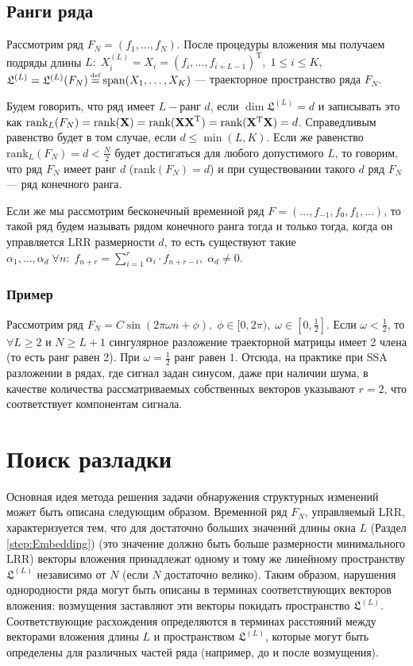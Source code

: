 \documentclass[specialist, substylefile = spbu.rtx,
			   subf, href, 12pt]{disser}
\newcommand\eqdef{\mathrel{\stackrel{\makebox[0pt]{\mbox{\normalfont\tiny def}}}{=}}}
\begin{document}
\section{Ранги ряда}
Рассмотрим ряд $F_N = (f_1,\dots,f_N)$. После процедуры вложения мы получаем подряды длины $L:\; X_i^{(L)} = X_i = (f_{i}, \dots, f_{i+L-1})^\mathrm{T}, \; 1 \leq i \leq K,$ $\mathfrak{L}^{(L)} = \mathfrak{L}^{(L)}(F_N) \eqdef \mathrm{span}(X_1, \dots, X_K)$ --- траекторное пространство ряда $F_N$.

Будем говорить, что ряд имеет $ L- $ранг $d$, если $\dim\mathfrak{L}^{(L)} = d$ и записывать это как $\textrm{rank}_L(F_N) = \textrm{rank}(\bold{X}) = \textrm{rank}(\bold{XX}^\mathrm{T}) = \textrm{rank}(\bold{X}^\mathrm{T}\bold{X}) = d$. Справедливым равенство будет в том случае, если $d\leq\min(L, K)$. Если же равенство $\textrm{rank}_L(F_N) = d < \frac{N}{2}$ будет достигаться для любого допустимого $L$, то говорим, что ряд $F_N$ имеет ранг $d$ ($\textrm{rank}(F_N) = d$) и при существовании такого $d$ ряд $F_N$ --- ряд конечного ранга.

Если же мы рассмотрим бесконечный временной ряд $F=(\dots, f_{-1}, f_0, f_1, \dots)$, то такой ряд будем называть рядом конечного ранга тогда и только тогда, когда он управляется LRR размерности $d$, то есть существуют такие $\alpha_1, \dots, \alpha_d \; \forall n: \; f_{n+r} = \sum\limits_{i=1}^{r} \alpha_i\cdot f_{n+r-i}, \; \alpha_d \neq 0$.

\subsection{Пример}

Рассмотрим ряд $F_N = C\sin(2\pi\omega n + \phi),\;\phi \in [0, 2\pi), \; \omega \in [0, \frac{1}{2}]$. Если $\omega < \frac{1}{2}$, то $\forall L\geq 2$ и $N\geq L+1$ сингулярное разложение траекторной матрицы имеет 2 члена (то есть ранг равен 2). При $\omega=\frac{1}{2}$ ранг равен $1$. Отсюда, на практике при SSA разложении в рядах, где сигнал задан синусом, даже при наличии шума, в качестве количества рассматриваемых собственных векторов указывают $r=2$, что соответствует компонентам сигнала.

\chapter{Поиск разладки} \label{sec:ch_2}
Основная идея метода решения задачи обнаружения структурных изменений может быть описана следующим образом. Временной ряд $F_N$, управляемый LRR, характеризуется тем, что для достаточно больших значений длины окна $L$ (Раздел \ref{step:Embedding}) (это значение должно быть больше размерности минимального LRR) векторы вложения принадлежат одному и тому же линейному пространству $\mathfrak{L}^{(L)}$ независимо от $N$ (если $N$ достаточно велико). Таким образом, нарушения однородности ряда могут быть описаны в терминах соответствующих векторов вложения: возмущения заставляют эти векторы покидать пространство $\mathfrak{L}^{(L)}$. Соответствующие расхождения определяются в терминах расстояний между векторами вложения длины $ L $ и пространством $\mathfrak{L}^{(L)}$, которые могут быть определены для различных частей ряда (например, до и после возмущения).
\end{document}
